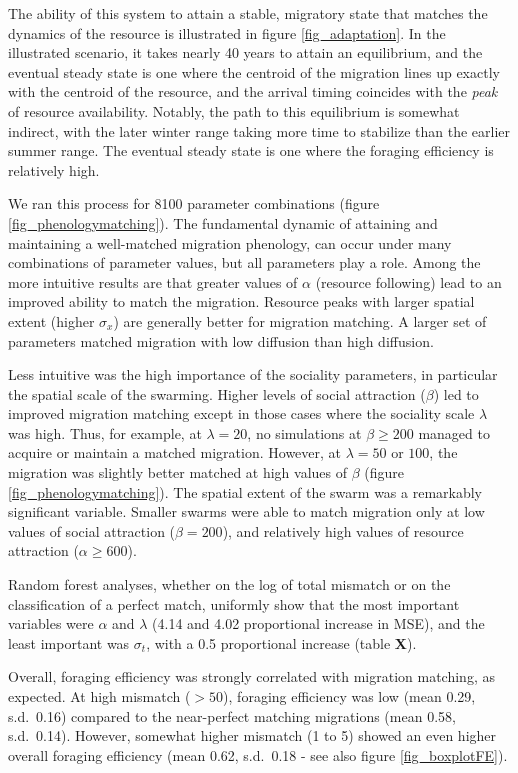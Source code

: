 \documentclass[utf8]{frontiersSCNS} %
\begin{document}
The ability of this system to attain a stable, migratory state that matches the dynamics of the resource is illustrated in figure \ref{fig_adaptation}. In the illustrated scenario, it takes nearly 40 years to attain an equilibrium, and the eventual steady state is one where the centroid of the migration lines up exactly with the centroid of the resource, and the arrival timing coincides with the \emph{peak} of resource availability. Notably, the path to this equilibrium is somewhat indirect, with the later winter range taking more time to stabilize than the earlier summer range. The eventual steady state is one where the foraging efficiency is relatively high.

We ran this process for 8100 parameter combinations (figure \ref{fig_phenologymatching}). The fundamental dynamic of attaining and maintaining a well-matched migration phenology, can occur under many combinations of parameter values, but all parameters play a role. Among the more intuitive results are that greater values of $\alpha$ (resource following) lead to an improved ability to match the migration. Resource peaks with larger spatial extent (higher $\sigma_x$) are generally better for migration matching. A larger set of parameters matched migration with low diffusion than high diffusion.

Less intuitive was the high importance of the sociality parameters, in particular the spatial scale of the swarming. Higher levels of social attraction ($\beta$) led to improved migration matching except in those cases where the sociality scale $\lambda$ was high. Thus, for example, at $\lambda = 20$, no simulations at $\beta \geq 200$ managed to acquire or maintain a matched migration. However, at $\lambda = 50$ or $100$, the migration was slightly better matched at high values of $\beta$ (figure \ref{fig_phenologymatching}). The spatial extent of the swarm was a remarkably significant variable. Smaller swarms were able to match migration only at low values of social attraction ($\beta = 200$), and relatively high values of resource attraction ($\alpha \geq 600$).

Random forest analyses, whether on the log of total mismatch or on the classification of a perfect match, uniformly show that the most important variables \citep{Breiman2001} were $\alpha$ and $\lambda$ (4.14 and 4.02 proportional increase in MSE), and the least important was $\sigma_t$, with a 0.5 proportional increase (table \textbf{X}).

Overall, foraging efficiency was strongly correlated with migration matching, as expected. At high mismatch ($>50$), foraging efficiency was low (mean 0.29, s.d.~0.16) compared to the near-perfect matching migrations (mean 0.58, s.d.~0.14). However, somewhat higher mismatch (1 to 5) showed an even higher overall foraging efficiency (mean 0.62, s.d.~0.18 - see also figure \ref{fig_boxplotFE}).
\end{document}
